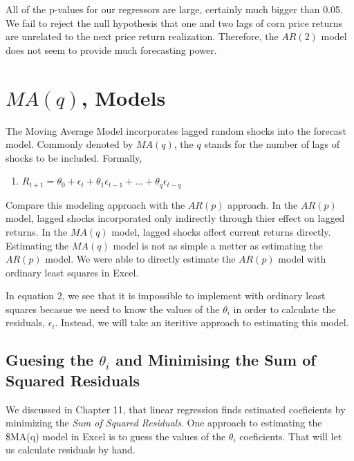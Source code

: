 \documentclass[
  letterpaper,
  DIV=11,
  numbers=noendperiod]{scrreprt}
\providecommand{\tightlist}{%
  \setlength{\itemsep}{0pt}\setlength{\parskip}{0pt}}\usepackage{longtable,booktabs,array}
\begin{document}
All of the p-values for our regressors are large, certainly much bigger
than 0.05. We fail to reject the null hypothesis that one and two lags
of corn price returns are unrelated to the next price return
realization. Therefore, the \(AR(2)\) model does not seem to provide
much forecasting power.

\hypertarget{maq-models}{%
\section{\texorpdfstring{\(MA(q)\),
Models}{MA(q), Models}}\label{maq-models}}

The Moving Average Model incorporates lagged random shocks into the
forecast model. Commonly denoted by \(MA(q)\), the \(q\) stands for the
number of lags of shocks to be included. Formally,

\begin{enumerate}
\def\labelenumi{\arabic{enumi}.}
\setcounter{enumi}{1}
\tightlist
\item
  \(R_{t+1} = \theta_0 + \epsilon_t + \theta_1\epsilon_{t-1} + ... + \theta_q\epsilon_{t-q}\)
\end{enumerate}

Compare this modeling approach with the \(AR(p)\) approach. In the
\(AR(p)\) model, lagged shocks incorporated only indirectly through
thier effect on lagged returns. In the \(MA(q)\) model, lagged shocks
affect current returns directly. Estimating the \(MA(q)\) model is not
as simple a metter as estimating the \(AR(p)\) model. We were able to
directly estimate the \(AR(p)\) model with ordinary least squares in
Excel.

In equation 2, we see that it is impossible to implement with ordinary
least squares becasue we need to know the values of the \(\theta_i\) in
order to calculate the residuals, \(\epsilon_i\). Instead, we will take
an iteritive approach to estimating this model.

\hypertarget{guesing-the-theta_i-and-minimising-the-sum-of-squared-residuals}{%
\subsection{\texorpdfstring{Guesing the \(\theta_i\) and Minimising the
Sum of Squared
Residuals}{Guesing the \textbackslash theta\_i and Minimising the Sum of Squared Residuals}}\label{guesing-the-theta_i-and-minimising-the-sum-of-squared-residuals}}

We discussed in Chapter 11, that linear regression finds estimated
coeficients by minimizing the \emph{Sum of Squared Residuals}. One
approach to estimating the \$MA(q) model in Excel is to guess the values
of the \(\theta_i\) coeficients. That will let us calculate residuals by
hand.
\end{document}
